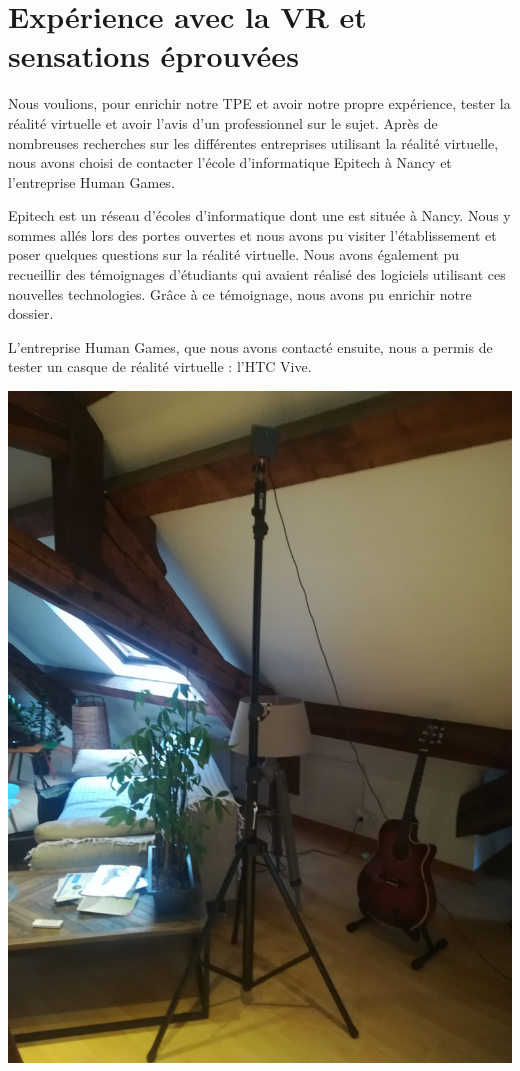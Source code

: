 \documentclass[12pt, a4paper]{report}
\begin{document}
\newpage

\section[\'{E}xpérience et sensations]{Expérience avec la VR et sensations éprouvées}

Nous voulions, pour enrichir notre TPE et avoir notre propre expérience, tester la réalité virtuelle et avoir l'avis d'un professionnel sur le sujet. Après de nombreuses recherches sur les différentes entreprises utilisant la réalité virtuelle, nous avons choisi de contacter l'école d'informatique  Epitech à Nancy et l'entreprise Human Games.

Epitech est un réseau d'écoles d'informatique dont une est située à Nancy. Nous y sommes allés lors des portes ouvertes et nous avons pu visiter l'établissement et poser quelques questions sur la réalité virtuelle. Nous avons également pu recueillir des témoignages d'étudiants qui avaient réalisé des logiciels utilisant ces nouvelles technologies. Grâce à ce témoignage, nous avons pu enrichir notre dossier.

L'entreprise Human Games, que nous avons contacté ensuite, nous a permis de tester un casque de réalité virtuelle : l'HTC Vive.

\begin{center}
\includegraphics[scale=0.04 ]{capteur.jpg}
\end{center}
\end{document}
